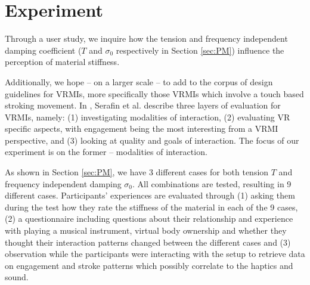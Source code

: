 \documentclass{article}
\begin{document}
\section{Experiment}\label{sec:exp}

Through a user study, we inquire how the tension and frequency independent damping coefficient ($T$ and $\sigma_0$ respectively in Section \ref{sec:PM}) influence the perception of material stiffness.
 
Additionally, we hope -- on a larger scale -- to add to the corpus of design guidelines for VRMIs, more specifically those VRMIs which involve a touch based stroking movement. In \cite{Serafin:2016}, Serafin et al. describe three layers of evaluation for VRMIs, namely: (1) investigating modalities of interaction, (2) evaluating VR specific aspects, with engagement being the most interesting from a VRMI perspective, and (3) looking at quality and goals of interaction. The focus of our experiment is on the former -- modalities of interaction.

As shown in Section \ref{sec:PM}, we have 3 different cases for both tension $T$ and frequency independent damping $\sigma_0$. All combinations are tested, resulting in 9 different cases. Participants' experiences are evaluated through (1) asking them during the test how they rate the stiffness of the material in each of the 9 cases, (2) a questionnaire including questions about their relationship and experience with playing a musical instrument, virtual body ownership and whether they thought their interaction patterns changed between the different cases and (3) observation while the participants were interacting with the setup to retrieve data on engagement and stroke patterns which possibly correlate to the haptics and sound.
\end{document}

